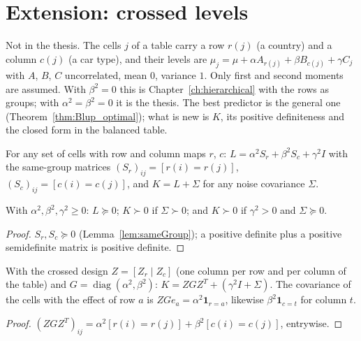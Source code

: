 \chapter{Extension: crossed levels}\label{ch:crossed}

Not in the thesis. The cells $j$ of a table carry a row $r(j)$ (a country) and a column
$c(j)$ (a car type), and their levels are
$\mu_j = \mu + \alpha A_{r(j)} + \beta B_{c(j)} + \gamma C_j$ with $A$, $B$, $C$
uncorrelated, mean $0$, variance $1$. Only first and second moments are assumed. With
$\beta^2 = 0$ this is Chapter~\ref{ch:hierarchical} with the rows as groups; with
$\alpha^2 = \beta^2 = 0$ it is the thesis. The best predictor is the general one
(Theorem~\ref{thm:Blup_optimal}); what is new is $K$, its positive
definiteness and the closed form in the balanced table.

\begin{definition}\label{def:crossed}
  \leanok
  For any set of cells with row and column maps $r$, $c$:
  $L = \alpha^2 S_r + \beta^2 S_c + \gamma^2 I$ with the same-group matrices
  $(S_r)_{ij} = [r(i) = r(j)]$, $(S_c)_{ij} = [c(i) = c(j)]$, and $K = L + \Sigma$ for any
  noise covariance $\Sigma$.
\end{definition}

\begin{lemma}\label{lem:crossed_posDef}
  \leanok
  With $\alpha^2, \beta^2, \gamma^2 \ge 0$: $L \succeq 0$; $K \succ 0$ if $\Sigma \succ 0$; and
  $K \succ 0$ if $\gamma^2 > 0$ and $\Sigma \succeq 0$.
\end{lemma}
\begin{proof}
  \leanok
  $S_r, S_c \succeq 0$ (Lemma~\ref{lem:sameGroup}); a positive definite plus a positive
  semidefinite matrix is positive definite.
\end{proof}

\begin{lemma}\label{lem:crossed_mixed}
  \leanok
  With the crossed design $Z = [Z_r \mid Z_c]$ (one column per row and per column of the table)
  and $G = \operatorname{diag}(\alpha^2, \beta^2)$: $K = ZGZ^T + (\gamma^2 I + \Sigma)$. The
  covariance of the cells with the effect of row $a$ is $ZGe_a = \alpha^2\mathbf 1_{r = a}$,
  likewise $\beta^2\mathbf 1_{c = t}$ for column $t$.
\end{lemma}
\begin{proof}
  \leanok
  $(ZGZ^T)_{ij} = \alpha^2[r(i) = r(j)] + \beta^2[c(i) = c(j)]$, entrywise.
\end{proof}

